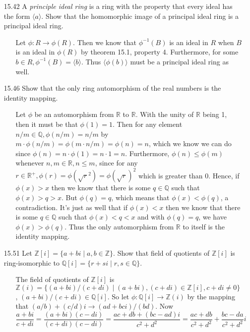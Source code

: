 \documentclass[12pt]{article}
\begin{document}
\begin{enumerate}
\item[15.42] A \emph{principle ideal ring} is a ring with the property that every ideal has the
form $\langle a\rangle$. Show that the homomorphic image of a principal ideal ring is a principal
ideal ring.
\begin{enumerate}
\item[] Let $\phi: R \rightarrow \phi(R)$. Then we know that $\phi^{-1}(B)$ is an 
ideal in $R$ when $B$ is an ideal in $\phi(R)$ by theorem 15.1, property 4. Furthermore, 
for some $b \in R, \phi^{-1}(B) = \langle b\rangle$. Thus $\langle \phi(b)\rangle$ must
be a principal ideal ring as well.
\end{enumerate}

\item[15.46] Show that the only ring automorphism of the real numbers is the identity mapping.
\begin{enumerate}
\item[] Let $\phi$ be an automorphism from $\mathbb{R}$ to $\mathbb{R}$. With the unity of $\mathbb{R}$ being 1,
then it must be that $\phi(1) = 1$. Then for any element $n/m \in \mathbb{Q}, \phi(n/m) = n/m$ by 
$m \cdot \phi(n/m) = \phi(m \cdot n/m) = \phi(n) = n$, which we know we can do since 
$\phi(n) = n \cdot \phi(1) = n \cdot 1 = n$. Furthermore, $\phi(n) \leq \phi(m)$ whenever $n, m \in \mathbb{R}, n \leq m$,
since for any $r \in \mathbb{R}^+, \phi(r) = \phi(\sqrt{r}^2) = \phi(\sqrt{r})^2$ which is greater than 0. Hence,
if $\phi(x) > x$ then we know that there is some $q \in \mathbb{Q}$ such that $\phi(x) > q > x$. But $\phi(q) = q$, which
means that $\phi(x) < \phi(q)$, a contradiction. It's just as well that if $\phi(x) < x$ then we know that 
there is some $q \in \mathbb{Q}$ such that $\phi(x) < q < x$ and with $\phi(q) = q$, we have $\phi(x) > \phi(q)$. Thus the
only automorphism from $\mathbb{R}$ to itself is the identity mapping.
\end{enumerate}

\item[15.51] Let $\mathbb{Z}[i] = \{ a + bi \mid a, b \in \mathbb{Z} \}$. Show that field of
quotients of $\mathbb{Z}[i]$ is ring-isomorphic to $\mathbb{Q}[i] = \{ r + si \mid r, s
\in \mathbb{Q} \}$.
\begin{enumerate}
\item[] The field of quotients of $\mathbb{Z}[i]$ is $\mathbb{Z}(i) = \{ (a + bi)/(c + di) \mid (a + bi), (c + di) \in \mathbb{Z}[i], 
c + di \neq 0 \}$, $(a + bi)/(c + di) \in \mathbb{Q}[i]$. So let $\phi: \mathbb{Q}[i] \rightarrow \mathbb{Z}(i)$ by the 
mapping that $(a/b) + (c/d)i \rightarrow (ad + bci)/(bd)$. Now
\[
\frac{a + bi}{c + di} = \frac{(a + bi)(c - di)}{(c + di)(c - di)} =
\frac{ac + db + (bc - ad)i}{c^2 + d^2} = \frac{ac + db}{c^2 + d^2} + \frac{bc - da}{c^2 + d^2}i
\]


\end{enumerate}
\end{enumerate}
\end{document}
